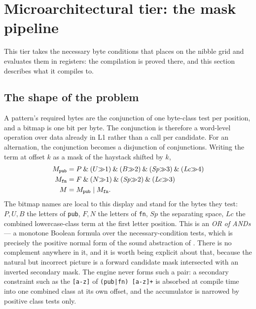 \documentclass[11pt,letterpaper]{article}
\begin{document}
\section{Microarchitectural tier: the mask pipeline}
\label{sec:micro}
This tier takes the necessary byte conditions that 
places on the nibble grid and evaluates them in registers: the compilation
is proved there, and this section describes what it compiles to.

\subsection{The shape of the problem}
\label{sec:micro:shape}
A pattern's required bytes are the conjunction of one byte-class test per
position, and a bitmap is one bit per byte. The conjunction is therefore a
word-level operation over data already in L1 rather than a call per
candidate. For an alternation, the conjunction becomes a disjunction of
conjunctions. Writing the term at offset $k$ as a mask of the haystack
shifted by $k$,
\begin{align}
\label{eq:oran}
M_{\texttt{pub}} &= P \mathbin{\&} (U{\gg}1) \mathbin{\&} (B{\gg}2)
                    \mathbin{\&} (\mathit{Sp}{\gg}3) \mathbin{\&} (\mathit{Lc}{\gg}4) \notag\\
M_{\texttt{fn}}  &= F \mathbin{\&} (N{\gg}1) \mathbin{\&} (\mathit{Sp}{\gg}2)
                    \mathbin{\&} (\mathit{Lc}{\gg}3) \notag\\
M &= M_{\texttt{pub}} \mid M_{\texttt{fn}} .
\end{align}
The bitmap names are local to this display and stand for the bytes they
test: $P,U,B$ the letters of \texttt{pub}, $F,N$ the letters of
\texttt{fn}, $\mathit{Sp}$ the separating space, $\mathit{Lc}$ the combined
lowercase-class term at the first letter position. This is an \emph{OR of
ANDs} --- a monotone Boolean formula over the
necessary-condition tests, which is precisely the positive normal form of
the sound abstraction of . There is no complement
anywhere in it, and it is worth being explicit about that, because the
natural but incorrect picture is a forward candidate mask intersected with
an inverted secondary mask. The engine never forms such a pair: a secondary
constraint such as the \texttt{[a-z]} of \texttt{(pub|fn) [a-z]+} is
absorbed at compile time into one combined class at its own offset, and the
accumulator is narrowed by positive class tests only.
\end{document}
